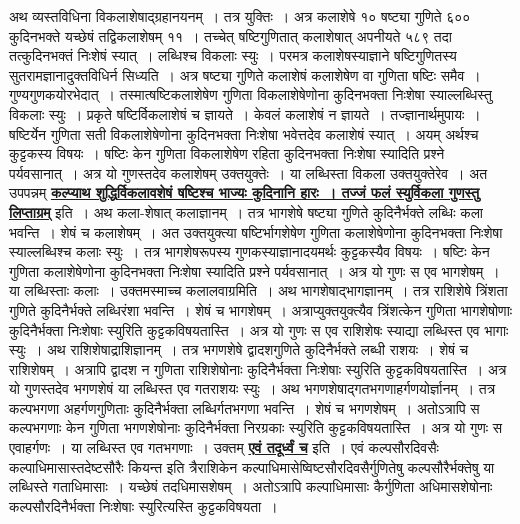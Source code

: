 \documentclass[11pt, openany]{book}
\begin{document}
{{\vspace{-4mm}
 अथ व्यस्तविधिना विकलाशेषाद्ग्रहानयनम्~। तत्र युक्तिः~। अत्र कलाशेषे 
१० षष्ट्या गुणिते ६०० कुदिनभक्ते यच्छेषं तद्विकलाशेषम् ११~।
तच्चेत् षष्टिगुणितात् कलाशेषात् अपनीयते ५८९ तदा तत्कुदिनभक्तं निःशेषं स्यात्~। लब्धिश्च
विकलाः स्युः~। परमत्र कलाशेषस्याज्ञाने षष्टिगुणितस्य सुतरामज्ञानादुक्तविधिर्न
सिध्यति~। अत्र षष्ट्या गुणिते कलाशेषं कलाशेषेण वा गुणिता षष्टिः समैव~।
गुण्यगुणकयोरभेदात्~। 
तस्मात्षष्टिकलाशेषेण गुणिता विकलाशेषेणोना कुदिनभक्ता निःशेषा
स्याल्लब्धिस्तु विकलाः स्युः~। प्रकृते षष्टिर्विकलाशेषं च ज्ञायते~। केवलं कलाशेषं न
ज्ञायते~। तज्ज्ञानार्थमुपायः~। षष्टिर्येन गुणिता सती विकलाशेषेणोना कुदिनभक्ता
निःशेषा भवेत्तदेव कलाशेषं स्यात्~। अयम् अर्थश्च कुट्टकस्य विषयः~। षष्टिः केन गुणिता
विकलाशेषेण रहिता कुदिनभक्ता निःशेषा स्यादिति प्रश्ने पर्यवसानात्~। अत्र
यो गुणस्तदेव कलाशेषम् उक्तयुक्तेः~। या लब्धिस्ता विकला उक्तयुक्तेरेव~। अत
उपपन्नम् \hyperref[67]{\textbf{कल्प्याथ शुद्धिर्विकलावशेषं षष्टिश्च भाज्यः कुदिनानि हारः~। तज्जं फलं 
स्युर्विकला गुणस्तु लिप्ताग्रम्}} इति~। अथ कला-शेषात् कलाज्ञानम्~। तत्र
भागशेषे षष्ट्या गुणिते कुदिनैर्भक्ते लब्धिः कला भवन्ति~। शेषं च कलाशेषम्~। अत 
उक्तयुक्त्या षष्टिर्भागशेषेण गुणिता कलाशेषेणोना कुदिनभक्ता निःशेषा
स्याल्लब्धिश्च 
कलाः स्युः~। तत्र भागशेषरूपस्य गुणकस्याज्ञानादयमर्थः कुट्टकस्यैव विषयः~। 
षष्टिः केन गुणिता कलाशेषेणोना कुदिनभक्ता निःशेषा स्यादिति प्रश्ने
पर्यवसानात्~। 
अत्र यो गुणः स एव भागशेषम्~। या लब्धिस्ताः कलाः~। उक्तमस्माच्च
कलालवाग्रमिति~। अथ भागशेषाद्भागज्ञानम्~। तत्र राशिशेषे त्रिंशता गुणिते
कुदिनैर्भक्ते लब्धिरंशा भवन्ति~। शेषं च भागशेषम्~।
अत्राप्युक्तयुक्त्यैव त्रिंशत्केन 
गुणिता भागशेषोणाः कुदिनैर्भक्ता निःशेषाः स्युरिति कुट्टकविषयतास्ति~।
अत्र यो 
गुणः स एव राशिशेषः स्याद्या लब्धिस्त एव भागाः स्युः~। अथ राशिशेषाद्राशिज्ञानम्~। तत्र भगणशेषे द्वादशगुणिते कुदिनैर्भक्ते लब्धी राशयः~। शेषं च
राशिशेषम्~। अत्रापि द्वादश न गुणिता राशिशेषोनाः कुदिनैर्भक्ता
निःशेषाः स्युरिति 
कुट्टकविषयतास्ति~। अत्र यो गुणस्तदेव भगणशेषं या लब्धिस्त एव गतराशयः 
स्युः~। अथ भगणशेषाद्गतभगणाहर्गणयोर्ज्ञानम्~। तत्र कल्पभगणा
अहर्गणगुणिताः
\newpage
\noindent कुदिनैर्भक्ता लब्धिर्गतभगणा भवन्ति~। शेषं च भगणशेषम्~। अतोऽत्रापि स कल्पभगणाः केन गुणिता भगणशेषोनाः कुदिनैर्भक्ता निरग्रकाः स्युरिति
कुट्टकविषयतास्ति~। अत्र यो गुणः स एवाहर्गणः~। या लब्धिस्त एव गतभगणाः~। उक्तम् \hyperref[67]{\textbf{एवं तदूर्ध्वं च}} इति~। एवं कल्पसौरदिवसैः कल्पाधिमासास्तदेष्टसौरैः कियन्त 
इति त्रैराशिकेन कल्पाधिमासेष्विष्टसौरदिवसैर्गुणितेषु
कल्पसौरैर्भक्तेषु या लब्धिस्ते
 गताधिमासाः~। यच्छेषं तदधिमासशेषम्~। अतोऽत्रापि कल्पाधिमासाः कैर्गुणिता
 अधिमासशेषोनाः कल्पसौरदिनैर्भक्ता निःशेषाः स्युरित्यस्ति कुट्टकविषयता~।
}}
\end{document}
